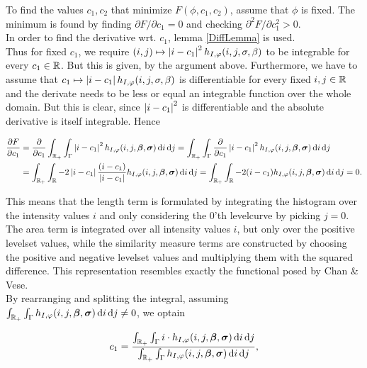 To find the values $c_1,c_2$ that minimize $F(\phi,c_1,c_2)$, assume that $\phi$ is fixed. The minimum is found by finding $\partial F/\partial c_1 =0$ and checking $\partial^2 F/\partial c_1^2 > 0$. \\

In order to find the derivative wrt. $c_1$, lemma \ref{DiffLemma} is used.\\
Thus for fixed $c_1$, we require $(i,j)\mapsto \left| {i-c_1} \right|^2h_{I,\varphi}(i,j,\sigma,\beta)$ to be integrable for every $c_1\in\mathbb R$. But this is given, by the argument above. Furthermore, we have to assume that  $c_1 \mapsto \left| {i-c_1} \right|h_{I,\varphi}(i,j,\sigma,\beta)$ is differentiable for every fixed $i,j\in \mathbb R$ and the derivate needs to be less or equal an integrable function over the whole domain. But this is clear, since $\left| {i-c_1} \right|^2$ is differentiable and the absolute derivative is itself integrable. Hence

\begin{equation}
  \begin{split}
    \frac{\partial F}{\partial c_1} &= \frac{\partial }{\partial c_1} \int_{\mathbb R_+}\int_{\Gamma}\left| {i-c_1} \right|^2 h_{I,\varphi}(i,j,\boldsymbol{\beta} ,\boldsymbol{\sigma} ) \,{\rm d} i\,{\rm d} j 
    = \int_{\mathbb R_+}\int_{\Gamma}\frac{\partial }{\partial c_1}\left| {i-c_1} \right|^2 h_{I,\varphi}(i,j,\boldsymbol{\beta} ,\boldsymbol{\sigma} ) \,{\rm d} i\,{\rm d} j \\
    &= \int_{\mathbb R_+} \int_\mathbb R-2\left| {i-c_1} \right|\frac{(i-c_1)}{\left| {i-c_1} \right|} h_{I,\varphi}(i,j,\boldsymbol{\beta} ,\boldsymbol{\sigma} ) \,{\rm d} i\,{\rm d} j 
    = \int_{\mathbb R_+} \int_\mathbb R-2(i-c_1) h_{I,\varphi}(i,j,\boldsymbol{\beta} ,\boldsymbol{\sigma} ) \,{\rm d} i\,{\rm d} j = 0.
  \end{split}
\end{equation}

This means that the length term is formulated by integrating the histogram over the intensity values $i$ and only considering the 0'th levelcurve by picking $j=0$. The area term is integrated over all intensity values $i$, but only over the positive levelset values, while the similarity measure terms are constructed by choosing the positive and negative levelset values and multiplying them with the squared difference. This representation resembles exactly the functional posed by Chan \& Vese.\\

By rearranging and splitting the integral, assuming $\int_{\mathbb R_+}\int_{\Gamma}h_{I,\varphi}(i,j,\boldsymbol{\beta} ,\boldsymbol{\sigma} ) \,{\rm d} i\,{\rm d} j\neq 0$, we optain

\begin{equation}
  c_1 = \frac{\int_{\mathbb R_+}  \int_{\Gamma}i\cdot h_{I,\varphi}(i,j,\boldsymbol{\beta} ,\boldsymbol{\sigma} ) \,{\rm d} i\,{\rm d} j}{\int_{\mathbb R_+}\int_{\Gamma}h_{I,\varphi}(i,j,\boldsymbol{\beta} ,\boldsymbol{\sigma} ) \,{\rm d} i\,{\rm d} j},
\end{equation}

